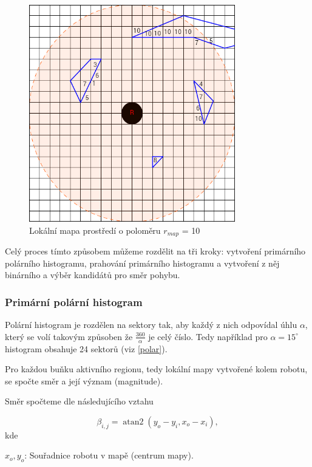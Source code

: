 \documentclass[twoside]{ctuthesis}
\theoremstyle{plain}
\theoremstyle{definition}
\theoremstyle{note}
\DeclareMathOperator{\atantwo}{atan2}
\begin{document}
\begin{figure}
	\caption{Lokální mapa prostředí o poloměru $r_{map}$ = 10}
	
	\label{mrizka}
	\includegraphics[width=0.8\textwidth]{images/3/mrizka.png}
\end{figure}

Celý proces tímto způsobem můžeme rozdělit na tři kroky: vytvoření primárního polárního histogramu, prahování primárního histogramu a vytvoření z něj binárního a výběr kandidátů pro směr pohybu.

\subsubsection{Primární polární histogram}

Polární histogram je rozdělen na sektory tak, aby každý z nich odpovídal úhlu $\alpha$, který se volí takovým způsoben že $\frac{360}{\alpha}$ je celý číslo. Tedy například pro $\alpha = 15^{\circ}$ histogram obsahuje 24 sektorů (viz \ref{polar}).

Pro každou buňku aktivního regionu, tedy lokální mapy vytvořené kolem robotu, se spočte směr a její význam (magnitude). 

Směr spočteme dle následujícího vztahu

\begin{equation}
\beta_{i,j} = 	\atantwo ( y_o - y_i, x_o - x_i),
\end{equation}
kde

$x_o, y_o$: Souřadnice robotu v mapě (centrum mapy).
\end{document}
